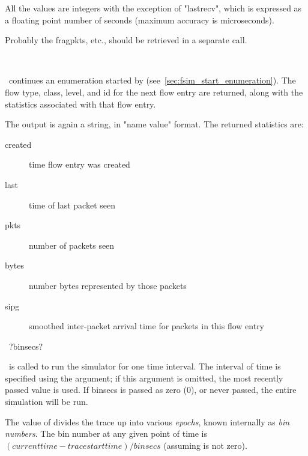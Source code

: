 \documentclass{article}
\begin{document}
All the values are integers with the exception of "lastrecv", which is
expressed as a floating point number of seconds (maximum accuracy is
microseconds).

\BUGS

Probably the fragpkts, etc., should be retrieved in a separate call.

\manend

\label{sec:fsim_continue_enumeration}

\SYNOPSIS \cmdname\

\DESCRIPTION

\cmdname\ continues an enumeration started by
 (see~\ref{sec:fsim_start_enumeration}).
The flow type, class, level, and id for the next flow entry are
returned, along with the statistics associated with that flow entry.

The output is again a string, in "name value" format.  The returned
statistics are:
\begin{description}
\item[created] time flow entry was created
\item[last] time of last packet seen
\item[pkts] number of packets seen
\item[bytes] number bytes represented by those packets
\item[sipg] smoothed inter-packet arrival time for packets in this flow
entry
\end{description}

\manend

\label{sec:fsim_read_one_bin}

\SYNOPSIS \cmdname\ ?binsecs?

\DESCRIPTION

\cmdname\ is called to run the simulator for one time
interval.  The interval of time is specified using the 
argument; if this argument is omitted, the most recently passed value
is used.  If binsecs is passed as zero (0), or never passed, the entire
simulation will be run.

The value of  divides the trace up into various
\emph{epochs}, known internally as \emph{bin numbers}.  The bin number
at any given point of time is $(currenttime-tracestarttime)/binsecs$
(assuming  is not zero).
\end{document}
